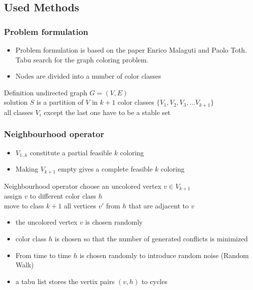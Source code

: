 \documentclass{beamer}
\begin{document}
\subsection{Used Methods}
\begin{frame}
    \frametitle{Problem formulation}
\begin{itemize}
  \item Problem formulation is based on the paper Enrico Malaguti and Paolo Toth. Tabu search for the graph coloring problem.
    \item Nodes are divided into a number of color classes
    \end{itemize}
         \begin{block}{Definition}
           undirected graph $G = (V,E)$ \\
           solution $S$ is a partition of $V$ in $k+1$ color classes 
           $\lbrace V_1, V_2, V_3, ... V_{k+1} \rbrace$ \\
           all classes $V_i$ except the last one have to be a stable set
       \end{block}
    
  \end{frame}

\begin{frame}
    \frametitle{Neighbourhood operator}

    \begin{itemize}
    \item $V_{1..k}$ constitute a partial feasible $k$ coloring
    \item Making $V_{k+1}$ empty gives a complete feasible $k$ coloring
    \end{itemize}

       \begin{block}{Neighbourhood operator}
           choose an uncolored vertex $v \in V_{k+1}$ \\
           assign $v$ to different color class $h$\\
           move to class $k+1$ all vertices $v'$ from $h$ that are adjacent to $v$
       \end{block}

       \begin{itemize}
     \item the uncolored vertex $v$ is chosen randomly
     \item color class $h$ is chosen so that the number of generated conflicts is minimized
     \item From time to time $h$ is chosen randomly to introduce random noise (Random Walk)
     \item a tabu list stores the vertix pairs $(v,h)$ to cycles


       \end{itemize}

\end{frame}
\end{document}
